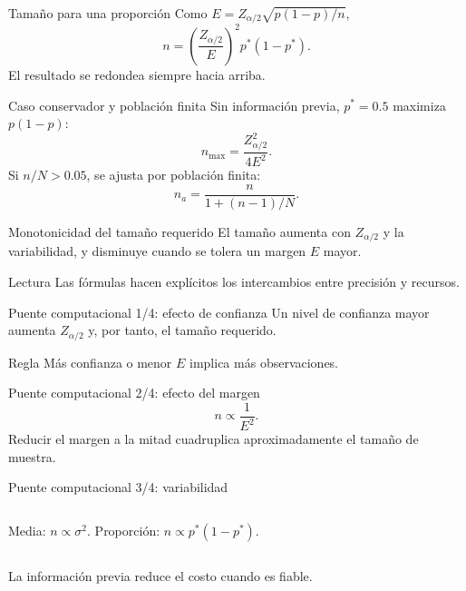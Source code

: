 \documentclass[10pt,aspectratio=169]{beamer}
\begin{document}
\begin{frame}{Tamaño para una proporción}
  \footnotesize
  Como $E=Z_{\alpha/2}\sqrt{p(1-p)/n}$,
  \[
    n=\left(\frac{Z_{\alpha/2}}{E}\right)^2p^*(1-p^*).
  \]
  El resultado se redondea siempre hacia arriba.
\end{frame}

\begin{frame}{Caso conservador y población finita}
  \footnotesize
  Sin información previa, $p^*=0.5$ maximiza $p(1-p)$:
  \[
    n_{\max}=\frac{Z_{\alpha/2}^2}{4E^2}.
  \]
  Si $n/N>0.05$, se ajusta por población finita:
  \[
    n_a=\frac{n}{1+(n-1)/N}.
  \]
\end{frame}

\begin{frame}{Monotonicidad del tamaño requerido}
  \footnotesize
  El tamaño aumenta con $Z_{\alpha/2}$ y la variabilidad, y disminuye cuando se
  tolera un margen $E$ mayor.
  \begin{alertblock}{Lectura}
    Las fórmulas hacen explícitos los intercambios entre precisión y recursos.
  \end{alertblock}
\end{frame}

\begin{frame}{Puente computacional 1/4: efecto de confianza}
  \footnotesize
  Un nivel de confianza mayor aumenta $Z_{\alpha/2}$ y, por tanto, el tamaño
  requerido.
  \begin{block}{Regla}
    Más confianza o menor $E$ implica más observaciones.
  \end{block}
\end{frame}

\begin{frame}{Puente computacional 2/4: efecto del margen}
  \footnotesize
  \[
    n\propto\frac1{E^2}.
  \]
  Reducir el margen a la mitad cuadruplica aproximadamente el tamaño de muestra.
\end{frame}

\begin{frame}{Puente computacional 3/4: variabilidad}
  \footnotesize
  \begin{columns}[T]
      Media: $n\propto\sigma^2$.
      Proporción: $n\propto p^*(1-p^*)$.
  \end{columns}
  \vspace{0.2cm}
  La información previa reduce el costo cuando es fiable.
\end{frame}
\end{document}

